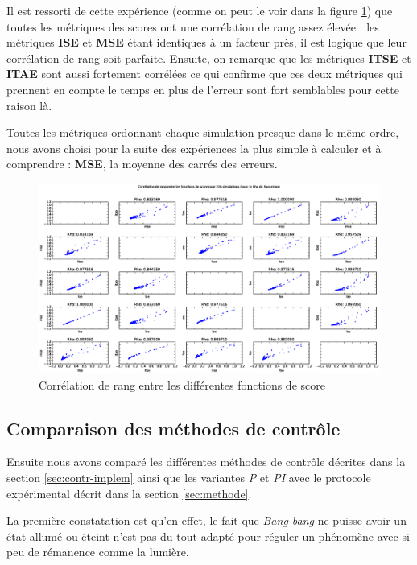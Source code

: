 \documentclass[a4paper,10pt]{report}
\begin{document}
Il est ressorti de cette expérience (comme on peut le voir dans la figure \ref{fig:correlation}) que toutes les métriques des scores ont une corrélation de rang assez élevée :
les métriques \textbf{ISE} et \textbf{MSE} étant identiques à un facteur près, il est logique que leur corrélation de rang soit parfaite.
Ensuite, on remarque que les métriques \textbf{ITSE} et \textbf{ITAE} sont aussi fortement corrélées ce qui confirme que ces deux métriques qui prennent en compte le temps en plus de l'erreur sont fort semblables pour cette raison là.

Toutes les métriques ordonnant chaque simulation presque dans le même ordre,
nous avons choisi pour la suite des expériences la plus simple à calculer et à comprendre :
\textbf{MSE}, la moyenne des carrés des erreurs.

\begin{figure}[hb!]
   \centering
   \includegraphics[scale=0.35]{correlation.eps}
   \caption{\label{fig:correlation} Corrélation de rang entre les différentes fonctions de score}
\end{figure}

\subsection{Comparaison des méthodes de contrôle}

Ensuite nous avons comparé les différentes méthodes de contrôle décrites dans la section \ref{sec:contr-implem} ainsi que les variantes \textit{P} et \textit{PI} avec le protocole expérimental décrit dans la section \ref{sec:methode}.

La première constatation est qu'en effet, le fait que \textit{Bang-bang} ne puisse avoir un état allumé ou éteint n'est pas du tout adapté pour réguler un phénomène avec si peu de rémanence comme la lumière.
\end{document}
